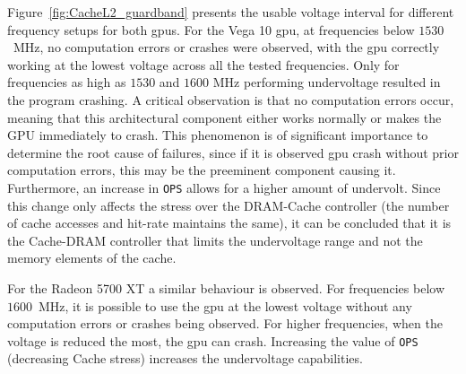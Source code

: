 Figure~\ref{fig:CacheL2_guardband} presents the usable voltage interval for different frequency setups for both \acrshort{gpu}s. 
For the Vega 10 \acrshort{gpu}, at frequencies below $1530$~MHz, no computation errors or crashes were observed, with the \acrshort{gpu} correctly working at the lowest voltage across all the tested frequencies. 
Only for frequencies as high as $1530$ and $1600$ MHz performing undervoltage resulted in the program crashing. A critical observation is that no computation errors occur, meaning that this architectural component either works normally or makes the GPU immediately to crash. This phenomenon is of significant importance to determine the root cause of failures, since if it is observed \acrshort{gpu} crash without prior computation errors, this may be the preeminent component causing it.
Furthermore, an increase in \texttt{OPS} allows for a higher amount of undervolt. Since this change only affects the stress over the DRAM-Cache controller (the number of cache accesses and hit-rate maintains the same), it can be concluded that it is the Cache-DRAM controller that limits the undervoltage range and not the memory elements of the cache. 

For the Radeon 5700 XT a similar behaviour is observed. For frequencies below $1600$~MHz, it is possible to use the \acrshort{gpu} at the lowest voltage without any computation errors or crashes being observed. For higher frequencies, when the voltage is reduced the most, the \acrshort{gpu} can crash. Increasing the value of \texttt{OPS} (decreasing Cache stress) increases the undervoltage capabilities. 



